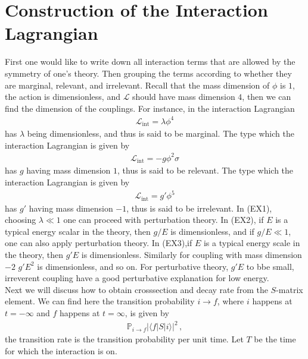 \documentclass[11pt, onesided]{book}
\theoremstyle{break}
\theoremstyle{break}
\begin{document}
\section[Construction of the Interaction Lagrangian]{\color{red} Construction of the Interaction Lagrangian\color{black}}
First one would like to write down all interaction terms that are allowed by the symmetry of one's theory. Then grouping the terms according to whether they are marginal, relevant, and irrelevant. Recall that the mass dimension of $\phi$ is $1$, the action is dimensionless, and $\mathcal{L}$ should have mass dimension $4$, then we can find the dimension of the couplings. For instance, in the interaction Lagrangian
\begin{align*}
\mathcal{L}_{\text{int}} = \lambda \phi^4 \tag{EX1}
\end{align*}
has $\lambda$ being dimensionless, and thus is said to be marginal. The type which the interaction Lagrangian is given by
\begin{align*}
\mathcal{L}_{\text{int}} = -g \phi^2 \sigma \tag{EX2}
\end{align*}
has $g$ having mass dimension $1$, thus is said to be relevant. 
The type which the interaction Lagrangian is given by
\begin{align*}
\mathcal{L}_{\text{int}} = g' \phi^5 \tag{EX3}
\end{align*}
has $g'$ having mass dimension $-1$, thus is said to be irrelevant. In (EX1), choosing $\lambda \ll 1$ one can proceed with perturbation theory. In (EX2), if $E$ is a typical energy scalar in the theory, then $g/E$ is dimensionless, and if $g/E \ll 1$, one can also apply perturbation theory. In (EX3),if $E$ is a typical energy scale in the theory, then $g'E$ is dimensionless. Similarly for coupling with mass dimension $-2$ $g'E^2$ is dimensionless, and so on. For perturbative theory, $g'E$ to bbe small, irreverent coupling have a good perturbative explanation for low energy.  \\

Next we will discuss how to obtain crosssection and decay rate from the $S$-matrix element. We can find here the transition probability $i \to f$, where $i $ happens at $t= -\infty$ and $f$ happens at $t = \infty$, is given by
\begin{align*}
\mathbb{P}_{i \to f}\left|\langle f | S | i \rangle \right|^2\,,
\end{align*}
the transition rate is the transition probability per unit time. Let $T$ be the time for which the interaction is on. \\
\end{document}
